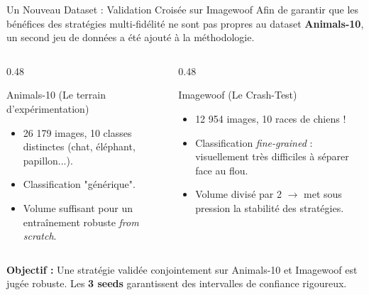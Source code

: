 \documentclass[aspectratio=169, 10pt]{beamer}
\begin{document}
\begin{frame}{Un Nouveau Dataset : Validation Croisée sur Imagewoof}
  Afin de garantir que les bénéfices des stratégies multi-fidélité ne sont pas propres au dataset \textbf{Animals-10}, un second jeu de données a été ajouté à la méthodologie.

  \vspace{0.6cm}
  \begin{columns}[T]
    \begin{column}{0.48\textwidth}
      \begin{exampleblock}{Animals-10 (Le terrain d'expérimentation)}
        \begin{itemize}\footnotesize
          \item 26 179 images, 10 classes distinctes (chat, éléphant, papillon...).
          \item Classification "générique".
          \item Volume suffisant pour un entraînement robuste \textit{from scratch}.
        \end{itemize}
      \end{exampleblock}
    \end{column}
    \begin{column}{0.48\textwidth}
      \begin{alertblock}{Imagewoof (Le Crash-Test)}
        \begin{itemize}\footnotesize
          \item 12 954 images, 10 races de chiens !
          \item Classification \textit{fine-grained} : visuellement très difficiles à séparer face au flou.
          \item Volume divisé par 2 $\rightarrow$ met sous pression la stabilité des stratégies.
        \end{itemize}
      \end{alertblock}
    \end{column}
  \end{columns}
  
  \vspace{0.3cm}
  \begin{center}
    \footnotesize\textbf{\color{primary}Objectif :} Une stratégie validée conjointement sur Animals-10 et Imagewoof est jugée robuste. Les \textbf{3 seeds} garantissent des intervalles de confiance rigoureux.
  \end{center}
\end{frame}
\end{document}
